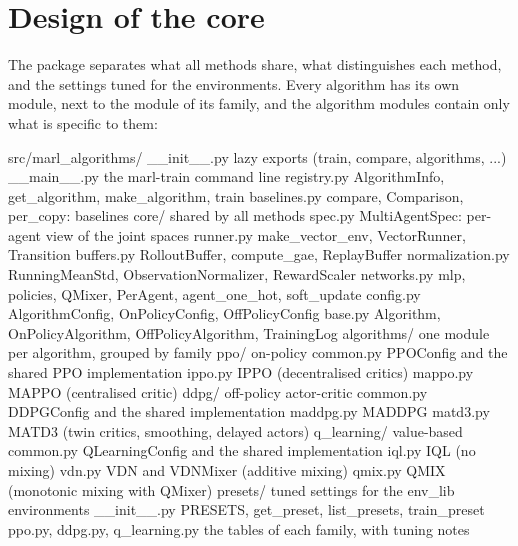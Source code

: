 \section{Design of the core}\label{sec:marl-core}

The package separates what all methods share, what distinguishes each
method, and the settings tuned for the environments. Every algorithm has its
own module, next to the  module of its family, and the algorithm
modules contain only what is specific to them:

\begin{textcode}
src/marl_algorithms/
  __init__.py           lazy exports (train, compare, algorithms, ...)
  __main__.py           the marl-train command line
  registry.py           AlgorithmInfo, get_algorithm, make_algorithm, train
  baselines.py          compare, Comparison, per_copy: baselines
  core/                 shared by all methods
    spec.py             MultiAgentSpec: per-agent view of the joint spaces
    runner.py           make_vector_env, VectorRunner, Transition
    buffers.py          RolloutBuffer, compute_gae, ReplayBuffer
    normalization.py    RunningMeanStd, ObservationNormalizer, RewardScaler
    networks.py         mlp, policies, QMixer, PerAgent, agent_one_hot,
                        soft_update
    config.py           AlgorithmConfig, OnPolicyConfig, OffPolicyConfig
    base.py             Algorithm, OnPolicyAlgorithm, OffPolicyAlgorithm,
                        TrainingLog
  algorithms/           one module per algorithm, grouped by family
    ppo/                on-policy
      common.py         PPOConfig and the shared PPO implementation
      ippo.py           IPPO (decentralised critics)
      mappo.py          MAPPO (centralised critic)
    ddpg/               off-policy actor-critic
      common.py         DDPGConfig and the shared implementation
      maddpg.py         MADDPG
      matd3.py          MATD3 (twin critics, smoothing, delayed actors)
    q_learning/         value-based
      common.py         QLearningConfig and the shared implementation
      iql.py            IQL (no mixing)
      vdn.py            VDN and VDNMixer (additive mixing)
      qmix.py           QMIX (monotonic mixing with QMixer)
  presets/              tuned settings for the env_lib environments
    __init__.py         PRESETS, get_preset, list_presets, train_preset
    ppo.py, ddpg.py, q_learning.py
                        the tables of each family, with tuning notes
\end{textcode}

